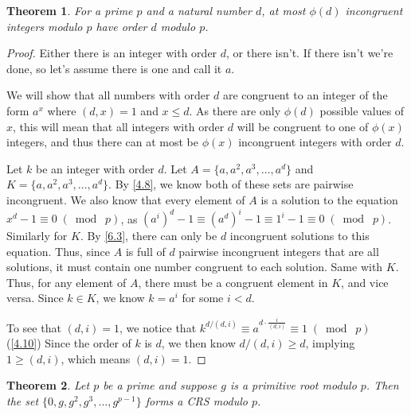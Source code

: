 \documentclass{article}
\newtheorem{thm}{Theorem}[section]
\numberwithin{equation}{thm}
\providecommand{\gmod}[1]{\; (\bmod \; #1)}
\begin{document}
\pagebreak



\begin{thm} \label{6.5}
  For a prime $p$ and a natural number $d$, at most $\phi (d)$ incongruent integers modulo $p$ have order $d$ modulo $p$.
\end{thm}

\begin{proof}
  Either there is an integer with order $d$, or there isn't. If there isn't we're done, so let's assume there is one and call it $a$.

  We will show that all numbers with order $d$ are congruent to an integer of the form $a^x$ where $(d, x) = 1$ and $x \leq d$. As there are only $\phi(d)$ possible values of $x$, this will mean that all integers with order $d$ will be congruent to one of $\phi(x)$ integers, and thus there can at most be $\phi(x)$ incongruent integers with order $d$.

  Let $k$ be an integer with order $d$. Let $A = \{a, a^2, a^3, \ldots, a^d\}$ and $K = \{a, a^2, a^3, \ldots, a^d\}$. By \ref{4.8}, we know both of these sets are pairwise incongruent. We also know that every element of $A$ is a solution to the equation $x^d - 1 \equiv 0 \gmod p$, as $(a^i)^d - 1 \equiv (a^d)^i - 1 \equiv 1^i - 1 \equiv 0 \gmod p$. Similarly for $K$.
  By \ref{6.3}, there can only be $d$ incongruent solutions to this equation. Thus, since $A$ is full of $d$ pairwise incongruent integers that are all solutions, it must contain one number congruent to each solution. Same with $K$. Thus, for any element of $A$, there must be a congruent element in $K$, and vice versa. Since $k \in K$, we know $k = a^i$ for some $i < d$.

  To see that $(d, i) = 1$, we notice that $k^{d/(d,i)} \equiv a^{d \cdot \frac{i}{(d,i)}} \equiv 1 \gmod p$ (\ref{4.10}) Since the order of $k$ is $d$, we then know $d/(d,i) \geq d$, implying $1 \geq (d,i)$, which means $(d,i) = 1$.
\end{proof}



\begin{thm} \label{6.6}
  Let $p$ be a prime and suppose $g$ is a primitive root modulo $p$. Then the set $\{0, g, g^2, g^3, \ldots, g^{p-1}\}$ forms a CRS modulo $p$.
\end{thm}
\end{document}
